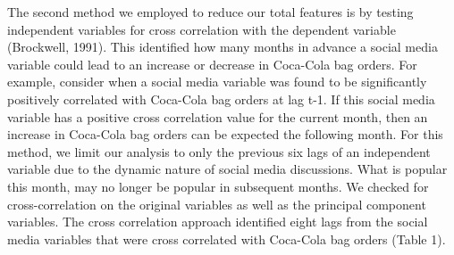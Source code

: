 \documentclass[12pt,oneside]{chicagocapstone}
\begin{document}
The second method we employed to reduce our total features is by testing independent variables for cross correlation with the dependent variable (Brockwell, 1991). This identified how many months in advance a social media variable could lead to an increase or decrease in Coca-Cola bag orders. For example, consider when a social media variable was found to be significantly positively correlated with Coca-Cola bag orders at lag t-1. If this social media variable has a positive cross correlation value for the current month, then an increase in Coca-Cola bag orders can be expected the following month. For this method, we limit our analysis to only the previous six lags of an independent variable due to the dynamic nature of social media discussions. What is popular this month, may no longer be popular in subsequent months. We checked for cross-correlation on the original variables as well as the principal component variables. The cross correlation approach identified eight lags from the social media variables that were cross correlated with Coca-Cola bag orders (Table 1).
\end{document}
